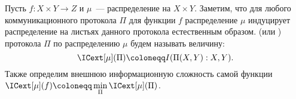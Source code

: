 







\begin{definition*}
    Пусть $f\colon X \times Y \to Z$ и $\mu$~--- распределение на $X \times Y$. Заметим, что для любого
    коммуникационного протокола $\Pi$ для функции $f$ распределение $\mu$ индуцирует распределение на
    листьях данного протокола естественным образом.  (или
    ) протокола $\Pi$ по распределению $\mu$ будем называть
    величину:
    $$\ICext[\mu](\Pi) \coloneqq I(\Pi(X, Y) : X, Y).$$
    Также определим внешнюю информационную сложность самой функции
    $\ICext[\mu](f) \coloneqq \min\limits_{\Pi} \ICext[\mu](\Pi)$.
\end{definition*}




\breakline







